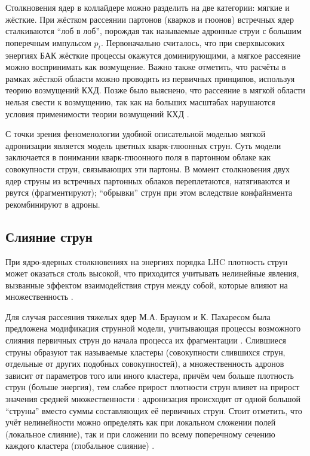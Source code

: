 Столкновения ядер в коллайдере можно разделить на две категории: мягкие и жёсткие. 
При жёстком рассеянии партонов (кварков и гюонов) встречных ядер  сталкиваются ``лоб в лоб'', порождая так называемые адронные струи с большим поперечным импульсом $p_t$. 
Первоначально считалось, что при сверхвысоких энергиях БАК
жёсткие процессы окажутся доминирующими, а мягкое рассеяние можно воспринимать как возмущение. 
Важно также отметить, что расчёты в рамках жёсткой области можно проводить из первичных принципов, используя теорию возмущений КХД. 
Позже было выяснено, что рассеяние в мягкой области нельзя свести к возмущению, так как на больших масштабах нарушаются условия применимости теории возмущений КХД \cite{SoftQCD1,SoftQCD2}.

С точки зрения феноменологии удобной описательной моделью мягкой адронизации является модель цветных кварк-глюонных струн\cite{ColorStringsModel1,ColorStringsModel2}. 
Суть модели заключается в понимании кварк-глюонного поля в партонном облаке как совокупности струн, связывающих эти партоны. 
В момент столкновения двух ядер струны из встречных партонных облаков переплетаются, натягиваются и рвутся (фрагментируют); ``обрывки'' струн при этом вследствие конфайнмента рекомбинируют в адроны. 
\subsection{Слияние струн}
При ядро-ядерных столкновениях на энергиях порядка LHC плотность струн может оказаться столь высокой, что приходится учитывать нелинейные явления, вызванные эффектом взаимодействия струн между собой, которые влияют на множественность \cite{StringFusion}.

Для случая рассеяния тяжелых ядер М.А. Брауном и К. Пахаресом была предложена модификация струнной модели, учитывающая процессы возможного слияния первичных струн до начала процесса их фрагментации \cite{PreFusion1, PreFusion2}. 
Слившиеся струны образуют так называемые кластеры (совокупности слившихся струн, отдельные от других подобных совокупностей), а множественность адронов зависит от параметров того или иного кластера, причём чем больше плотность струн (больше энергия), тем слабее прирост плотности струн влияет на прирост значения средней множественности \cite{MulReduction}: адронизация происходит от одной большой ``струны'' вместо суммы составляющих её первичных струн. 
Стоит отметить, что учёт нелинейности можно определять как при локальном сложении полей (локальное слияние), так и при сложении по всему поперечному сечению каждого кластера (глобальное слияние) \cite{MulReduction}.

